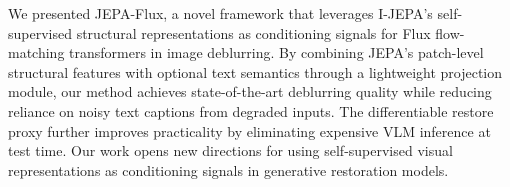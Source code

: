 \documentclass{article}
\begin{document}
We presented JEPA-Flux, a novel framework that leverages I-JEPA's self-supervised structural representations as conditioning signals for Flux flow-matching transformers in image deblurring. By combining JEPA's patch-level structural features with optional text semantics through a lightweight projection module, our method achieves state-of-the-art deblurring quality while reducing reliance on noisy text captions from degraded inputs. The differentiable restore proxy further improves practicality by eliminating expensive VLM inference at test time. Our work opens new directions for using self-supervised visual representations as conditioning signals in generative restoration models.



\end{document}
